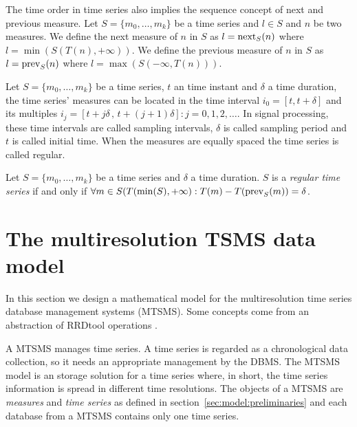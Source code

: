 The time order in time series also implies the sequence concept of
next and previous measure.  Let $S=\{m_0, \ldots, m_k\}$ be a time
series and $l\in S$ and $n$ be two measures. We define the next
measure of $n$ in $S$ as $l=\operatorname*{next}_S(n)$ where $l =
\min(S(T(n),+\infty))$. We define the previous measure of $n$ in $S$
as $l=\operatorname*{prev}_S(n)$ where $l = \max(S(-\infty,T(n)))$.



Let $S=\{m_0,\ldots,m_k\}$ be a time series, $t$ an time instant and
$\delta$ a time duration, the time series' measures can be located in
the time interval $i_0=[t,t+\delta]$ and its multiples $i_j=[t+j\delta
\,,\, t+(j+1)\delta]: j=0,1,2,\ldots$. In signal processing, these
time intervals are called sampling intervals, $\delta$ is called
sampling period and $t$ is called initial time. When the measures are
equally spaced the time series is called regular.

\begin{definition}
  Let $S=\{m_0,\ldots,m_k\}$ be a time series and $\delta$ a time
  duration. $S$ is a \emph{regular time series} if and only if $\forall m \in
  S(T(\min(S),+\infty): T(m) - T(\operatorname*{prev}_S(m)) =
  \delta$. %
\end{definition}



\section{The multiresolution TSMS data model}
\label{sec:MTSMS}

In this section we design a mathematical model for the multiresolution
time series database management systems (MTSMS). Some concepts come
from an abstraction of RRDtool operations \cite{rrdtool}.

A MTSMS manages time series. A time series is regarded as a
chronological data collection, so it needs an appropriate management
by the DBMS.  The MTSMS model is an storage solution for a time series
where, in short, the time series information is spread in different
time resolutions.  The objects of a MTSMS are \emph{measures} and
\emph{time series} as defined in section~\ref{sec:model:preliminaries}
and each database from a MTSMS contains only one time series.

